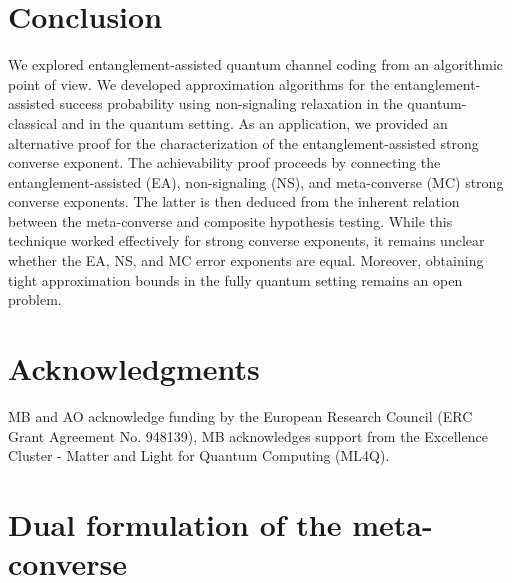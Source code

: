 \documentclass[a4paper,onecolumn,11pt,accepted=2025-10-01]{quantumarticle}
\begin{document}

\section{Conclusion}

We explored entanglement-assisted quantum channel coding from an algorithmic point of view. We developed approximation algorithms for the entanglement-assisted success probability using non-signaling relaxation in the quantum-classical and in the quantum setting. As an application, we provided an alternative proof for the characterization of the entanglement-assisted strong converse exponent. The achievability proof proceeds by connecting the entanglement-assisted (EA), non-signaling (NS), and meta-converse (MC) strong converse exponents. The latter is then deduced from the inherent relation between the meta-converse and composite hypothesis testing. While this technique worked effectively for strong converse exponents, it remains unclear whether the EA, NS, and MC error exponents are equal. Moreover, obtaining tight approximation bounds in the fully quantum setting remains an open problem.


\section*{Acknowledgments}

MB and AO acknowledge funding by the European Research Council (ERC Grant Agreement No. 948139), MB acknowledges support from the Excellence Cluster - Matter and Light for Quantum Computing (ML4Q).





\printbibliography


\appendix

\section{Dual formulation of the meta-converse}\label{app:dual-MC}
\end{document}
